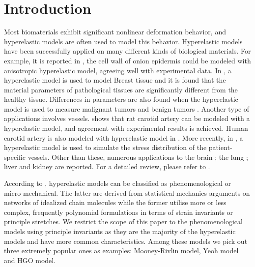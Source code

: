 \section{Introduction}
Most biomaterials exhibit significant nonlinear deformation behavior, and hyperelastic models are often used to model this behavior. Hyperelastic models have been successfully applied on many different kinds of biological materials. For example, it is reported in \cite{Qian}, the cell wall of onion epidermis could be modeled with anisotropic hyperelastic model, agreeing well with experimental data. In  \cite{OHagen}, a hyperelastic model is used to model Breast tissue and it is found that the material parameters of pathological tissues are significantly different from the healthy tissue. Differences in parameters are also found when the hyperelastic model is used to measure malignant tumors and benign tumors \cite{Oberai}. Another type of applications involves vessels. \cite{Zidi} shows that rat carotid artery can be modeled with a hyperelastic model, and agreement with experimental results is achieved. Human carotid artery is also modeled with hyperelastic model in \cite{Zidi2}. More recently, in \cite{Bols}, a hyperelastic model is used to simulate the stress distribution of the patient-specific vessels.
Other than these, numerous applications to the brain \cite{Karimi, Samani, Gilchrist}; the lung \cite{Wall, Wall2}; liver and kidney \cite{Fu, Untaroiu, Willinger} are reported. For a detailed review, please refer to \cite{Kupriyanova}.

According to \cite{Steinmann}, hyperelastic models can be classified as phenomenological or micro-mechanical. The latter are derived from statistical mechanics arguments on networks of idealized chain molecules while the former utilise more or less complex, frequently polynomial formulations in terms of strain invariants or principle stretches. We restrict the scope of this paper to the phenomenological models using principle invariants as they are the majority of the hyperelastic models and have more common characteristics. Among these models we pick out three extremely popular ones as examples: Mooney-Rivlin model, Yeoh model and HGO model.


